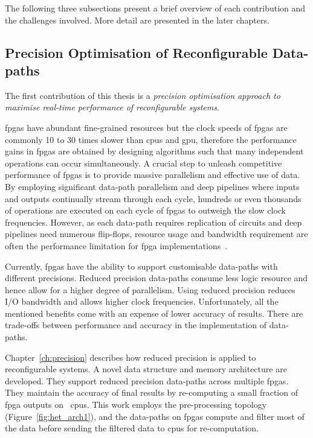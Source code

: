 The following three subsections present a brief overview of each contribution and the challenges involved.
More detail are presented in the later chapters.

\subsection{Precision Optimisation of Reconfigurable Data-paths}

The first contribution of this thesis is a \textit{precision optimisation approach to maximise real-time performance of reconfigurable systems}.

\glspl{fpga} have abundant fine-grained resources but the clock speeds of \glspl{fpga} are commonly 10 to 30 times slower than \glspl{cpu} and \gls{gpu},
therefore the performance gains in \glspl{fpga} are obtained by designing algorithms such that many independent operations can occur simultaneously.
A crucial step to unleash competitive performance of \glspl{fpga} is to provide massive parallelism and effective use of data.
By employing significant data-path parallelism and deep pipelines where inputs and outputs continually stream through each cycle, hundreds or even thousands of operations are executed on each cycle of \glspl{fpga} to outweigh the slow clock frequencies.
However, as each data-path requires replication of circuits and deep pipelines need numerous flip-flops, resource usage and bandwidth requirement are often the performance limitation for \gls{fpga} implementations~\cite{stitt11}.

Currently, \glspl{fpga} have the ability to support customisable data-paths with different precisions.
Reduced precision data-paths consume less logic resource and hence allow for a higher degree of parallelism.
Using reduced precision reduces I/O bandwidth and allows higher clock frequencies.
Unfortunately, all the mentioned benefits come with an expense of lower accuracy of results.
There are trade-offs between performance and accuracy in the implementation of data-paths.

Chapter~\ref{ch:precision} describes how reduced precision is applied to reconfigurable systems.
A novel data structure and memory architecture are developed.
They support reduced precision data-paths across multiple \glspl{fpga}.
They maintain the accuracy of final results by re-computing a small fraction of \gls{fpga} outputs on ~\glspl{cpu}.
This work employs the pre-processing topology (Figure~\ref{fig:het_arch1}), and the data-paths on \glspl{fpga} compute and filter most of the data before sending the filtered data to \glspl{cpu} for re-computation.

